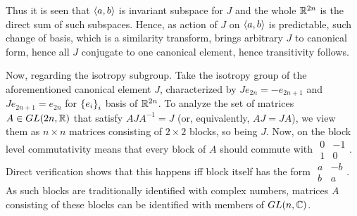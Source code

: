\documentclass[10pt]{article} %
\begin{document}
\begin{enumerate}[1. ]
Thus it is seen that $\left<a,b\right>$ is invariant subspace for $J$ and the whole $\mathbb{R}^{2n}$ is the direct sum of such subspaces. Hence, as action
of $J$ on $\left<a,b\right>$ is predictable, such change of basis, which is a similarity transform, brings arbitrary $J$ to canonical form, hence
all $J$ conjugate to one canonical element, hence transitivity follows.

Now, regarding the isotropy subgroup. Take the isotropy group of the aforementioned canonical element $J$, characterized by $Je_{2n}=-e_{2n+1}$
and $Je_{2n+1}=e_{2n}$ for $\left\{e_i\right\}_i$ basis of $\mathbb{R}^{2n}$. To analyze the set of matrices $A\in GL(2n,\mathbb{R})$ that satisfy $AJA^{-1}=J$
(or, equivalently, $AJ=JA$), we view them as $n\times n$ matrices consisting of $2\times2$ blocks, so being $J$. Now, on the block level 
commutativity means that every block of $A$ should commute with $\begin{smallmatrix}0&-1\\1&0\end{smallmatrix}$. Direct verification shows
that this happens iff block itself has the form $\begin{smallmatrix}a&-b\\b&a\end{smallmatrix}$. As such blocks are traditionally identified
with complex numbers, matrices $A$ consisting of these blocks can be identified with members of $GL(n,\mathbb{C})$.


\end{enumerate}
\end{document}
